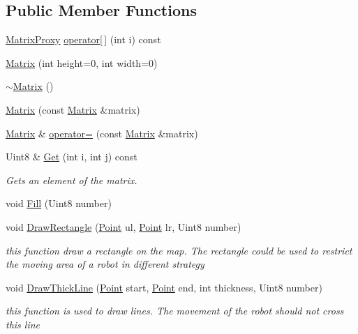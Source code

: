 \subsection*{Public Member Functions}
\begin{DoxyCompactItemize}
\item 
\hyperlink{classMatrix_1_1MatrixProxy}{MatrixProxy} \hyperlink{classMatrix_ab54bf109f85ced0472a7e0c03d16471c}{operator\mbox{[}$\,$\mbox{]}} (int i) const 
\item 
\hyperlink{classMatrix_a1cf5bd8134711df6f63e1dbef1912b86}{Matrix} (int height=0, int width=0)
\item 
\hyperlink{classMatrix_a9b1c3627f573d78a2f08623fdfef990f}{$\sim$Matrix} ()
\item 
\hyperlink{classMatrix_a2b1fedfb1b076d4ae504d2c61019871f}{Matrix} (const \hyperlink{classMatrix}{Matrix} \&matrix)
\item 
\hyperlink{classMatrix}{Matrix} \& \hyperlink{classMatrix_a45e4814b752129bed1f1316632f8543a}{operator=} (const \hyperlink{classMatrix}{Matrix} \&matrix)
\item 
Uint8 \& \hyperlink{classMatrix_a06fc8df480cd88daf69eaa05867cb7bd}{Get} (int i, int j) const 
\begin{DoxyCompactList}\small\item\em Gets an element of the matrix. \item\end{DoxyCompactList}\item 
void \hyperlink{classMatrix_a4a7c3875be94e94786db920c441973e6}{Fill} (Uint8 number)
\item 
void \hyperlink{classMatrix_a55977ba3ee91f352759f446a5092ea23}{DrawRectangle} (\hyperlink{structMatrix_1_1Point}{Point} ul, \hyperlink{structMatrix_1_1Point}{Point} lr, Uint8 number)
\begin{DoxyCompactList}\small\item\em this function draw a rectangle on the map. The rectangle could be used to restrict the moving area of a robot in different strategy \item\end{DoxyCompactList}\item 
void \hyperlink{classMatrix_a8aecf2d42e65b27f051c8af79aeeb467}{DrawThickLine} (\hyperlink{structMatrix_1_1Point}{Point} start, \hyperlink{structMatrix_1_1Point}{Point} end, int thickness, Uint8 number)
\begin{DoxyCompactList}\small\item\em this function is used to draw lines. The movement of the robot should not cross this line \item\end{DoxyCompactList}\item 

\end{DoxyCompactItemize}
